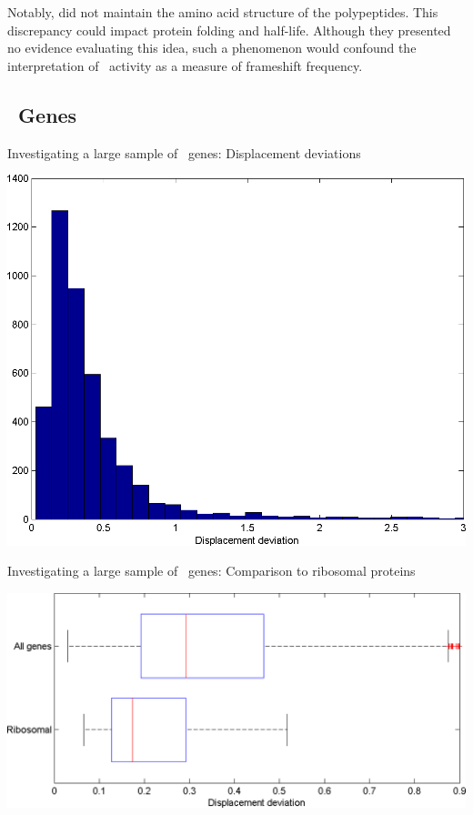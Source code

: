 \documentclass[twocolumn, article, oneside]{memoir}
\begin{document}
Notably, \citeauthor{weiss87} did not maintain the amino acid structure of the polypeptides.
This discrepancy could impact protein folding and half-life.  Although they
presented no evidence evaluating this idea, such a phenomenon would confound the interpretation
of \bgals\ activity as a measure of frameshift frequency.

\subsection{\ecoli\ Genes}
\begin{cfigure}
  \caption{Investigating a large sample of \ecoli\ genes: Displacement deviations}
  \label{ecoli:hist}
  \includegraphics[width=\linewidth]{histograms/everything}
\end{cfigure}

\begin{cfigure}
  \caption{Investigating a large sample of \ecoli\ genes: Comparison
    to ribosomal proteins}
  \label{ribosomal:comp}
  \includegraphics[width=\linewidth]{histograms/ribosomal}
\end{cfigure}
\end{document}
